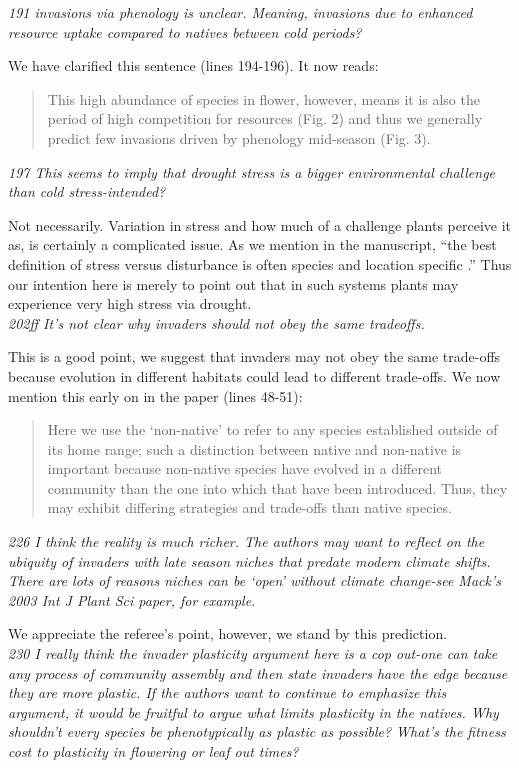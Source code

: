 \documentclass[11pt,a4paper]{letter}
\begin{document}
\begin{letter}{}
\emph{191 invasions via phenology is unclear. Meaning, invasions due to enhanced resource uptake compared to natives between cold periods?}

We have clarified this sentence (lines 194-196). It now reads:
\begin{quote}
This high abundance of species in flower, however, means it is also the period of high competition for resources (Fig. 2) and thus we generally predict few invasions driven by phenology mid-season (Fig. 3). 
\end{quote}

\emph{197 This seems to imply that drought stress is a bigger environmental challenge than cold stress-intended?}

Not necessarily. Variation in stress and how much of a challenge plants perceive it as, is certainly a complicated issue. As we mention in the manuscript, ``the best definition of stress versus disturbance is often species and location specific \citep{crainebook}.'' Thus our intention here is merely to point out that in such systems plants may experience very high stress via drought. \\

\emph{202ff It's not clear why invaders should not obey the same tradeoffs.}

This is a good point, we suggest that invaders may not obey the same trade-offs because evolution in different habitats could lead to different trade-offs. We now mention this early on in the paper (lines 48-51):

\begin{quote}
Here we use the `non-native' to refer to any species established outside of its home range; such a distinction between native and non-native is important because non-native species have evolved in a different community than the one into which that have been introduced. Thus, they may exhibit differing strategies and trade-offs than native species.  
\end{quote}

\emph{226 I think the reality is much richer. The authors may want to reflect on the ubiquity of invaders with late season niches that predate modern climate shifts. There are lots of reasons niches can be `open' without climate change-see Mack's 2003 Int J Plant Sci paper, for example.}

We appreciate the referee's point, however, we stand by this prediction.\\

\emph{230 I really think the invader plasticity argument here is a cop out-one can take any process of community assembly and then state invaders have the edge because they are more plastic. If the authors want to continue to emphasize this argument, it would be fruitful to argue what limits plasticity in the natives. Why shouldn't every species be phenotypically as plastic as possible? What's the fitness cost to plasticity in flowering or leaf out times?}


\end{letter}
\end{document}
